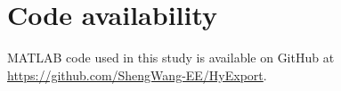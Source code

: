 \documentclass[pdflatex,lineno,sn-mathphys,Numbered]{sn-jnl}%
\begin{document}
\section*{Code availability}

MATLAB code used in this study is available on GitHub at \url{https://github.com/ShengWang-EE/HyExport}.


\begin{appendices}







\end{appendices}



\end{document}
